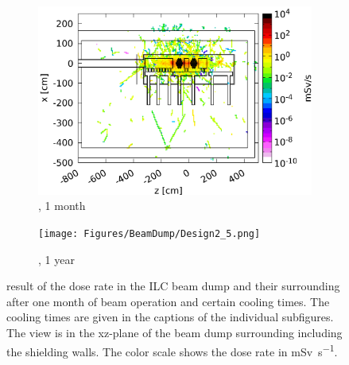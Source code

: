    \begin{figure}[htb]\ContinuedFloat
    \begin{subfigure}[b]{0.49\textwidth}
   \centering
    \includegraphics[width=\textwidth]{Figures/BeamDump/Design2_4.png}
   \caption{\designtwo, 1 month}
   \end{subfigure}
   \hfill
    \begin{subfigure}[b]{0.49\textwidth}
   \centering
    \texttt{[image: Figures/BeamDump/Design2\_5.png]}
   \caption{\designtwo, 1 year}
   \end{subfigure}
   \caption[Dose rate in the ILC main beam dump \designtwo after cooling times]{\fluka result of the dose rate in the ILC beam dump \designtwo and their surrounding after one month of beam operation and certain cooling times.
   The cooling times are given in the captions of the individual subfigures.
   The view is in the xz-plane of the beam dump surrounding including the shielding walls.
   The color scale shows the dose rate in \si{\milli\sievert\per\second}.}
\end{figure}

\FloatBarrier